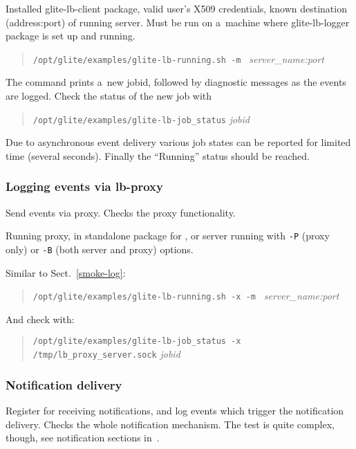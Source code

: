 \req Installed glite-lb-client package, valid user's X509 credentials,
known destination (address:port) of running \LB server.
Must be run on a~machine where glite-lb-logger package is set up and running.

\how
\begin{quote}
\verb'/opt/glite/examples/glite-lb-running.sh -m ' \emph{server\_name:port}
\end{quote}

The command prints a~new jobid, followed by diagnostic messages as the events are logged. 
Check the status of the new job with
\begin{quote}
\verb'/opt/glite/examples/glite-lb-job_status' \emph{jobid}
\end{quote}

\result
Due to asynchronous event
delivery various job states can be reported for limited time (several seconds).
Finally the
``Running'' status should be reached.

\subsubsection{Logging events via lb-proxy}

Send events via \LB proxy. Checks the proxy functionality.

\req Running \LB proxy, in standalone package for \LBold, or
\LB server running with \verb'-P' (proxy only) or \verb'-B' (both server and proxy)
options.

\how Similar to Sect.~\ref{smoke-log}:
\begin{quote}
\verb'/opt/glite/examples/glite-lb-running.sh -x -m ' \emph{server\_name:port}
\end{quote}

And check with:
\begin{quote}
\verb'/opt/glite/examples/glite-lb-job_status -x /tmp/lb_proxy_server.sock' \emph{jobid}
\end{quote}


\subsubsection{Notification delivery}

Register for receiving notifications, and log events which trigger
the notification delivery. Checks the whole notification mechanism.
The test is quite complex, though, see notification sections in~\cite{lbug,lbtp}.
